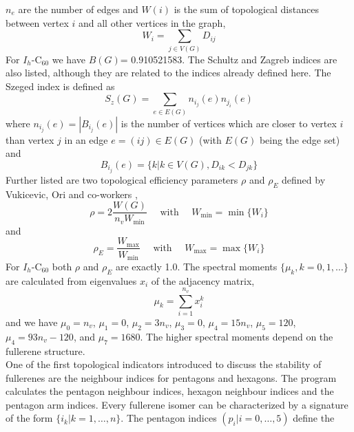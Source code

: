 \documentclass[article,a4paper,twoside]{memoir}
\newcommand{\C}[1]{\ensuremath{\mathrm{C}_{#1}}}
\begin{document}
$n_e$ are the number of edges and $W(i)$ is the sum of topological distances between vertex $i$ and all other vertices in the graph,
\begin{equation}
  \label{sum}
  W_i=\sum_{j \in V(G)} D_{ij}
\end{equation}
For $I_h$-\C{60} we have $B(G)$= 0.910521583. The Schultz and Zagreb indices are also listed, although they are related to
the indices already defined here. The Szeged index is defined as\cite{Heydari}
\begin{equation}
  \label{Szeged}
  S_z(G)=\sum_{e \in E(G)} n_{i_j}(e)n_{j_i}(e)
\end{equation}
where $n_{i_j}(e) = |B_{i_j}(e)|$ is the number of vertices which are closer to vertex $i$ than vertex $j$ in an edge $e=(ij) \in E(G)$ (with
$E(G)$ being the edge set) and
\begin{equation}
  \label{Szeged1}
  B_{i_j}(e)= \{ k | k \in V(G), D_{ik} < D_{jk} \}
\end{equation}
Further listed are two topological efficiency parameters $\rho$ and $\rho_E$ defined by Vukicevic, Ori and co-workers \cite{Vukicevic,Ori},
\begin{equation}
  \label{rho}
  \rho=2\frac{W(G)}{n_v W_{\mathrm{min}}} \quad \text{ with } \quad W_{\mathrm{min}}= \min \{ W_i \}
\end{equation}
and
\begin{equation}
  \label{rhoE}
  \rho_E=\frac{W_{\mathrm{max}}}{W_{\mathrm{min}}} \quad \text{ with } \quad W_{\mathrm{max}}= \max \{ W_i \}
\end{equation}
For $I_h$-\C{60} both $\rho$ and $\rho_E$ are exactly 1.0. The spectral moments $\{ \mu_k, k=0,1,\dots \} $ are calculated from eigenvalues $x_i$ of the adjacency matrix,
\begin{equation}
  \label{specmom}
  \mu_k=\sum_{i=1}^{n_v} x_i^k
\end{equation}
and we have $\mu_0 = n_v$, $\mu_1 = 0$, $\mu_2 = 3n_v$, $\mu_3 = 0$, $\mu_4 = 15n_v$, $\mu_5 = 120$, $\mu_4 = 93n_v - 120$, and $\mu_7 = 1680$.
The higher spectral moments depend on the fullerene structure.\cite{Fowler93}\\
One of the first topological indicators introduced to discuss the stability of fullerenes are the neighbour indices for pentagons and
hexagons. The program calculates the pentagon neighbour indices,\cite{Atlas,Albertazzi} hexagon neighbour indices and the pentagon arm indices.\cite{Reti}
Every fullerene isomer can be characterized by a signature of the form $\{i_k | k=1, \dots , n\}$. The pentagon indices $(p_i | i=0, \dots , 5)$ define the
\end{document}
